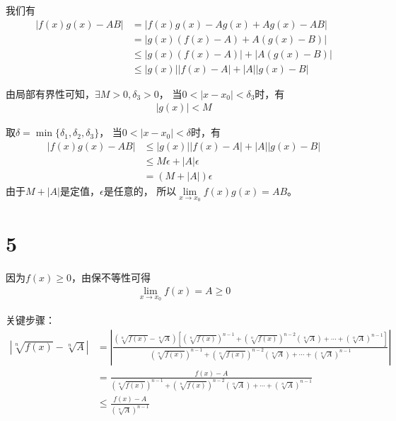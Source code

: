 \documentclass{article}
\begin{document}
\begin{itemize}
\begin{itemize}
                我们有
                \begin{align*}
                  |f(x) g(x) - AB|
                   & = |f(x) g(x) - Ag(x) + Ag(x) - AB|    \\
                   & = |g(x)(f(x) - A) + A(g(x) - B)|      \\
                   & \leq |g(x)(f(x) - A)| + |A(g(x) - B)| \\
                   & \leq |g(x)||f(x) - A| + |A||g(x) - B|
                \end{align*}

                由局部有界性可知，$\exists M>0, \delta_3 > 0$，
                当$0 < |x - x_0| < \delta_3$时，有
                \begin{align*}
                  |g(x)| < M
                \end{align*}

                取$\delta = \min\{\delta_1, \delta_2, \delta_3\}$，
                当$0 < |x - x_0| < \delta$时，有
                \begin{align*}
                  |f(x) g(x) - AB|
                   & \leq |g(x)||f(x) - A| + |A||g(x) - B| \\
                   & \leq M\epsilon + |A|\epsilon          \\
                   & = (M + |A|)\epsilon
                \end{align*}
                由于$M + |A|$是定值，$\epsilon$是任意的，
                所以$\lim \limits_{x \to x_0} f(x) g(x) = AB$。

        \end{itemize}
\end{itemize}

\section*{5}

因为$f(x) \geq 0$，由保不等性可得
\begin{align*}
  \lim\limits_{x \to x_0} f(x) = A \geq 0
\end{align*}

关键步骤：
\begin{align*}
  |\sqrt[n]{f(x)} - \sqrt[n]{A}|
   & = |\frac{(\sqrt[n]{f(x)} - \sqrt[n]{A})[(\sqrt[n]{f(x)})^{n - 1} + (\sqrt[n]{f(x)})^{n - 2}(\sqrt[n]{A}) + \cdots + (\sqrt[n]{A})^{n - 1}]}{(\sqrt[n]{f(x)})^{n - 1} + (\sqrt[n]{f(x)})^{n - 2}(\sqrt[n]{A}) + \cdots + (\sqrt[n]{A})^{n - 1}}| \\
   & = \frac{f(x) - A}{(\sqrt[n]{f(x)})^{n - 1} + (\sqrt[n]{f(x)})^{n - 2}(\sqrt[n]{A}) + \cdots + (\sqrt[n]{A})^{n - 1}}                                                                                                                            \\
   & \leq \frac{f(x) - A}{(\sqrt[n]{A})^{n - 1}}
\end{align*}
\end{document}

